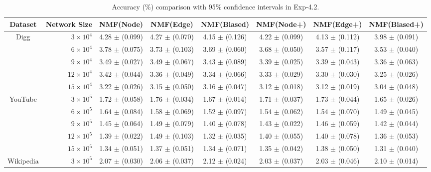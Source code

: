 \documentclass[10pt,journal,compsoc]{IEEEtran}
\newcommand{\Node}{{\sf NMF(Node)}\xspace}
\newcommand{\Edge}{{\sf NMF(Edge)}\xspace}
\newcommand{\Biased}{{\sf NMF(Biased)}\xspace}
\newcommand{\Digg}{{\sf Digg}\xspace}
\newcommand{\YouTube}{{\sf YouTube}\xspace}
\newcommand{\Wikipedia}{{\sf Wikipedia}\xspace}
\newcommand{\Nodep}{{\sf NMF(Node+)}\xspace}
\newcommand{\Edgep}{{\sf NMF(Edge+)}\xspace}
\newcommand{\Biasedp}{{\sf NMF(Biased+)}\xspace}
\begin{document}
\begin{table}
\caption{Accuracy (\%) comparison with 95\% confidence intervals in Exp-4.2.}
\label{tab_accuracy_6}
\vspace{-2ex}
\centering
\newcommand{\tabincell}[2]{\begin{tabular}{@{}#1@{}}#2\end{tabular}}
\begin{tabular}{c|r|c|c|c|c|c|c}
\hline \hline Dataset  & Network Size &  \Node & \Edge & \Biased & \Nodep & \Edgep & \Biasedp   \\
\hline
\multirow{5}{*}{\Digg}
 & $3 \times 10^4 $  & 4.28 $\pm$ (0.099) & 4.27 $\pm$ (0.070) & 4.15 $\pm$ (0.126) & 4.22 $\pm$ (0.099) & 4.13 $\pm$ (0.112) & 3.98 $\pm$ (0.091) \\
 & $6 \times 10^4 $  & 3.78 $\pm$ (0.075) & 3.73 $\pm$ (0.103) & 3.69 $\pm$ (0.060) & 3.68 $\pm$ (0.050) & 3.57 $\pm$ (0.117) & 3.53 $\pm$ (0.040)  \\
 & $9 \times 10^4 $  & 3.49 $\pm$ (0.027) & 3.49 $\pm$ (0.067) & 3.43 $\pm$ (0.089) & 3.39 $\pm$ (0.025) & 3.39 $\pm$ (0.043) & 3.36 $\pm$ (0.063)  \\
 & $12 \times 10^4 $ & 3.42 $\pm$ (0.044) & 3.36 $\pm$ (0.049) & 3.34 $\pm$ (0.066) & 3.33 $\pm$ (0.029) & 3.30 $\pm$ (0.030) & 3.25 $\pm$ (0.026) \\
 & $15 \times 10^4 $ & 3.22 $\pm$ (0.026) & 3.15 $\pm$ (0.050) & 3.16 $\pm$ (0.047) & 3.12 $\pm$ (0.018) & 3.12 $\pm$ (0.019) & 3.04 $\pm$ (0.048)  \\
\hline
\multirow{5}{*}{\YouTube}
 & $3 \times 10^5 $  & 1.72 $\pm$ (0.058) & 1.76 $\pm$ (0.034) & 1.67 $\pm$ (0.014) & 1.71 $\pm$ (0.037) & 1.73 $\pm$ (0.044) & 1.65 $\pm$ (0.026)  \\
 & $6 \times 10^5 $  & 1.64 $\pm$ (0.084) & 1.58 $\pm$ (0.069) & 1.52 $\pm$ (0.097) & 1.54 $\pm$ (0.062) & 1.54 $\pm$ (0.070) & 1.49 $\pm$ (0.045)  \\
 & $9 \times 10^5 $  & 1.45 $\pm$ (0.064) & 1.49 $\pm$ (0.079) & 1.40 $\pm$ (0.078) & 1.43 $\pm$ (0.022) & 1.46 $\pm$ (0.059) & 1.42 $\pm$ (0.044)  \\
 & $12 \times 10^5 $ & 1.39 $\pm$ (0.022) & 1.49 $\pm$ (0.103) & 1.32 $\pm$ (0.035) & 1.40 $\pm$ (0.055) & 1.40 $\pm$ (0.078) & 1.36 $\pm$ (0.053)  \\
 & $15 \times 10^5 $ & 1.34 $\pm$ (0.051) & 1.37 $\pm$ (0.051) & 1.34 $\pm$ (0.071) & 1.35 $\pm$ (0.042) & 1.38 $\pm$ (0.050) & 1.31 $\pm$ (0.040)  \\
\hline
\multirow{5}{*}{\Wikipedia}
 & $3 \times 10^5 $  & 2.07 $\pm$ (0.030) & 2.06 $\pm$ (0.037) & 2.12 $\pm$ (0.024) & 2.03 $\pm$ (0.037) & 2.03 $\pm$ (0.046) & 2.10 $\pm$ (0.014)  \\

\end{tabular}
\end{table}
\end{document}
